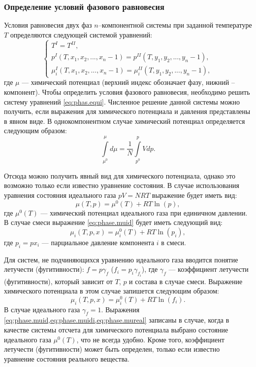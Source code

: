 \subsubsection{Определение условий фазового равновесия}
Условия равновесия двух фаз $n$--компонентной системы при заданной температуре $T$ определяются следующей системой уравнений:
\begin{equation}\label{eq:phas.equi}
\left\lbrace 
\begin{gathered} 
T^{I}=T^{II},\\
p^{I}(T,x_1,x_2,...,x_n-1)=p^{II}(T,y_1,y_2,...,y_n-1),\\
\mu_i^{I}(T,x_1,x_2,...,x_n-1)=\mu^{II}_i(T,y_1,y_2,...,y_n-1),
\end{gathered} 
\right.
\end{equation}
где $\mu$ --- химический потенциал (верхний индекс обозначает фазу, нижний – компонент). Чтобы определить условия фазового равновесия, необходимо решить систему уравнений \eqref{eq:phas.equi}. Численное решение данной системы можно получить, если выражения для химического потенциала и давления представлены в явном виде.
В однокомпонентном случае химический потенциал определяется следующим образом:
\begin{equation}
\int\limits_{\mu^0}^{\mu} d \mu=\dfrac{1}{N} \int\limits_{p^0}^{p} Vdp.
\end{equation}

Отсюда можно получить явный вид для химического потенциала, однако это возможно только если известно уравнение состояния. В случае использования уравнения состояния идеального газа $pV=NRT$ выражение будет иметь вид:
\begin{equation} \label{eq:phase.muid}
	\mu(T,p)=\mu^0(T)+RT \ln (p),
\end{equation}
где $\mu^0(T)$ --- химический потенциал идеального газа при единичном давлении. В случае смеси выражение \eqref{eq:phase.muid} будет иметь следующий вид:
\begin{equation} \label{eq:phase.muidi}
	\mu_i (T,p,x) = \mu_i^0(T) + RT \ln(p_i),
\end{equation}
где $p_i=p x_i$ --- парциальное давление компонента $i$ в смеси.

Для систем, не подчиняющихся уравнению идеального газа вводится понятие летучести (фугитивности): $f=p \gamma_f$ ($f_i=p_i \gamma_{f_i}$), где $\gamma_f$ --- коэффициент летучести (фугитивности), который зависит от $T$, $p$ и состава в случае смеси. Выражение химического потенциала в этом случае запишется следующим образом:
\begin{equation} \label{eq:phase.mureal}
	\mu_i (T,p,x) = \mu_i^0(T) + RT \ln(f_i).
\end{equation}
В случае идеального газа $\gamma_f=1$.
Выражения \cref{eq:phase.muid,eq:phase.muidi,eq:phase.mureal} записаны в случае, когда в качестве системы отсчета для химического потенциала выбрано состояние идеального газа $\mu^0(T)$, что не всегда удобно. Кроме того, коэффициент летучести (фугитивности) может быть определен, только если известно уравнение состояния реального вещества. 

